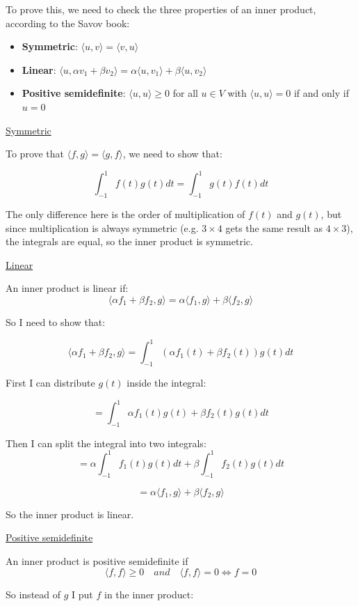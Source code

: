 \documentclass[11pt, a4paper]{article}
\begin{document}
To prove this, we need to check the three properties of an inner product, according to the Savov book:
\begin{itemize}
	\item \textbf{Symmetric}: $\langle u, v \rangle = \langle v, u \rangle$
	\item \textbf{Linear}: $\langle u, \alpha v_1 + \beta v_2 \rangle = \alpha \langle u, v_1 \rangle + \beta \langle u, v_2 \rangle$
	\item \textbf{Positive semidefinite}: $\langle u, u \rangle \geq 0$ for all $u \in V$ with $\langle u, u \rangle = 0$ if and only if $u = 0$
\end{itemize}

\underline{Symmetric}

To prove that $\langle f, g \rangle = \langle g, f \rangle$, we need to show that:

\[
\int_{-1}^{1} f(t) g(t) dt = \int_{-1}^{1} g(t) f(t) dt
\]

The only difference here is the order of multiplication of $f(t)$ and $g(t)$, but since multiplication is always symmetric (e.g. $3 \times 4$ gets the same result as $4 \times 3$), the integrals are equal, so the inner product is symmetric.


\underline{Linear}

An inner product is linear if:
\[
\langle \alpha f_1 + \beta f_2, g \rangle = \alpha \langle f_1, g \rangle + \beta \langle f_2, g \rangle
\]

So I need to show that:

\[
\langle \alpha f_1 + \beta f_2, g \rangle = \int_{-1}^{1} {(\alpha f_1(t) + \beta f_2(t))} g(t) dt
\]

First I can distribute $g(t)$ inside the integral:

\[
= \int_{-1}^{1} \alpha f_1(t) g(t) + \beta f_2(t) g(t) dt
\]

Then I can split the integral into two integrals:
\[
= \alpha \int_{-1}^{1} f_1(t) g(t) dt + \beta \int_{-1}^{1} f_2(t) g(t) dt
\]

\[
= \alpha \langle f_1, g \rangle + \beta \langle f_2, g \rangle
\]

So the inner product is linear.



\underline{Positive semidefinite}

An inner product is positive semidefinite if 
\[
\langle f, f \rangle \geq 0 \quad and \quad \langle f, f \rangle = 0 \iff f = 0
\]

So instead of $g$ I put $f$ in the inner product:
\end{document}
